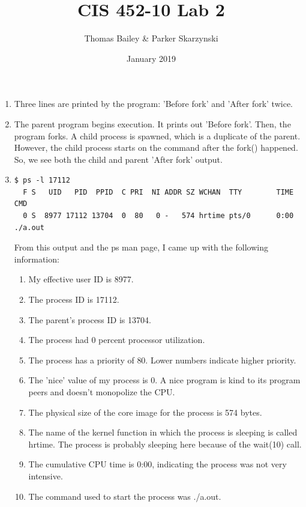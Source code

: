 \documentclass{article}
\title{CIS 452-10 Lab 2}
\author{Thomas Bailey & Parker Skarzynski}
\date{January 2019}
\begin{document}
\maketitle

\begin{enumerate}
    \item Three lines are printed by the program: 'Before fork' and 'After fork' twice.
    
    \item The parent program begins execution. It prints out 'Before fork'. Then, the program forks. A child process is spawned, which is a duplicate of the parent. However, the child process starts on the command after the fork() happened. So, we see both the child and parent 'After fork' output.
    
    \item
    \begin{verbatim}
$ ps -l 17112
  F S   UID   PID  PPID  C PRI  NI ADDR SZ WCHAN  TTY        TIME CMD
  0 S  8977 17112 13704  0  80   0 -   574 hrtime pts/0      0:00 ./a.out
    \end{verbatim}

    From this output and the ps man page, I came up with the following information:
    \begin{enumerate}
        \item My effective user ID is 8977.
        \item The process ID is 17112.
        \item The parent's process ID is 13704.
        \item The process had 0 percent processor utilization.
        \item The process has a priority of 80. Lower numbers indicate higher priority.
        \item The 'nice' value of my process is 0. A nice program is kind to its program peers and doesn't monopolize the CPU.
        \item The physical size of the core image for the process is 574 bytes.
        \item The name of the kernel function in which the process is sleeping is called hrtime. The process is probably sleeping here because of the wait(10) call.
        \item The cumulative CPU time is 0:00, indicating the process was not very intensive.
        \item The command used to start the process was ./a.out.
    \end{enumerate}
    

\end{enumerate}
\end{document}
